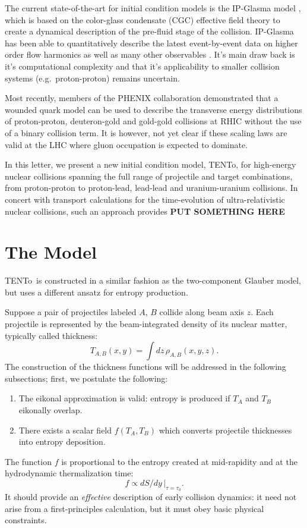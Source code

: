 \documentclass[aps,prl,reprint,amsmath,nofootinbib]{revtex4-1}
\newcommand{\trento}{T\raisebox{-.5ex}{R}ENTo}
\begin{document}
The current state-of-the-art for initial condition models is the IP-Glasma model \cite{}, which is based on the color-glass condensate (CGC) effective 
field theory \cite{} to create a dynamical description of the pre-fluid stage of the collision.  IP-Glasma has been able to quantitatively describe the 
latest event-by-event data on higher order flow harmonics as well as many other observables \cite{Schenke:2014zha}. It's main draw back is it's computational 
complexity and that it's applicability to smaller collision systems (e.g.~proton-proton) remains uncertain.

Most recently, members of the PHENIX collaboration demonstrated that a wounded quark model can be used to describe the transverse energy distributions of 
proton-proton, deuteron-gold and gold-gold collisions at RHIC without the use of a binary collision term. It is however, not yet clear if these scaling laws are
valid at the LHC where gluon occupation is expected to dominate.

In this letter, we present a new initial condition model, \trento, for high-energy nuclear collisions spanning the full range of projectile and target combinations, 
from proton-proton to proton-lead, lead-lead and uranium-uranium collisions. In concert with transport calculations for the time-evolution of ultra-relativistic 
nuclear collisions, such an approach provides {\bf PUT SOMETHING HERE} %

\section{The Model}

\trento\ is constructed in a similar fashion as the two-component Glauber model, but uses a different ansatz
for entropy production. 

Suppose a pair of projectiles labeled $A$, $B$ collide along beam axis $z$.  Each projectile is represented by
the beam-integrated density of its nuclear matter, typically called thickness:
\begin{equation}
  T_{A,B}(x, y) = \int dz \, \rho_{A,B}(x, y, z).
\end{equation}
The construction of the thickness functions will be addressed in the following subsections; first, we
postulate the following:
\begin{enumerate}
  \item The eikonal approximation is valid:  entropy is produced if $T_A$ and $T_B$ eikonally overlap.
  \item There exists a scalar field $f(T_A, T_B)$ which converts projectile thicknesses into entropy
    deposition.
\end{enumerate}
The function $f$ is proportional to the entropy created at mid-rapidity and at the hydrodynamic thermalization
time:
\begin{equation}
  f \propto dS/dy \, |_{\tau = \tau_0}.
\end{equation}
It should provide an \emph{effective} description of early collision dynamics:  it need not arise from a
first-principles calculation, but it must obey basic physical constraints.
\end{document}
